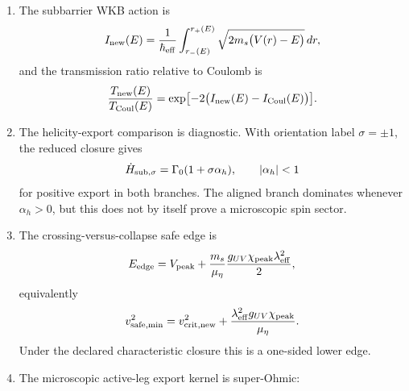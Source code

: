 \begin{theorem}
\begin{enumerate}[leftmargin=2.2em]
  \begin{equation}
  \label{eq:part08-main-vcrit-new}
  v_{\rm crit,new}=\sqrt{\frac{2}{m_s}\bigl(V_{\rm peak}-V(r_0)\bigr)},
  \end{equation}
  while the pure-Coulomb contact threshold is
  \begin{equation}
  \label{eq:part08-main-vcrit-coul}
  v_{\rm contact,Coul}
  =
  \sqrt{\frac{2}{m_s}\left(\frac1{r_{\rm contact}}-\frac1{r_0}\right)}.
  \end{equation}
  If \(v_{\rm crit,new}<v_0<v_{\rm contact,Coul}\), the lowered branch reaches contact while the pure Coulomb branch still turns back.
  \item The subbarrier WKB action is
  \begin{equation}
  \label{eq:part08-main-wkb-action}
  I_{\rm new}(E)=
  \frac{1}{\hbar_{\rm eff}}
  \int_{r_-(E)}^{r_+(E)}
  \sqrt{2m_s\bigl(V(r)-E\bigr)}\,dr,
  \end{equation}
  and the transmission ratio relative to Coulomb is
  \begin{equation}
  \label{eq:part08-main-transmission-ratio}
  \frac{T_{\rm new}(E)}{T_{\rm Coul}(E)}
  =
  \exp\bigl[-2\bigl(I_{\rm new}(E)-I_{\rm Coul}(E)\bigr)\bigr].
  \end{equation}
  \item The helicity-export comparison is diagnostic.  With orientation label \(\sigma=\pm1\), the reduced closure gives
  \begin{equation}
  \label{eq:part08-main-helicity-rate}
  \dot H_{{\rm sub},\sigma}=\Gamma_0(1+\sigma\alpha_h),
  \qquad
  |\alpha_h|<1
  \end{equation}
  for positive export in both branches.  The aligned branch dominates whenever \(\alpha_h>0\), but this does not by itself prove a microscopic spin sector.
  \item The crossing-versus-collapse safe edge is
  \begin{equation}
  \label{eq:part08-main-goldilocks-edge}
  E_{\rm edge}=V_{\rm peak}
  +
  \frac{m_s}{\mu_\eta}
  \frac{g_{UV}\chi_{\rm peak}\lambda_{\rm eff}^{2}}{2},
  \end{equation}
  equivalently
  \begin{equation}
  \label{eq:part08-main-goldilocks-speed}
  v_{\rm safe,min}^{2}
  =
  v_{\rm crit,new}^{2}
  +
  \frac{\lambda_{\rm eff}^{2}g_{UV}\chi_{\rm peak}}{\mu_\eta}.
  \end{equation}
  Under the declared characteristic closure this is a one-sided lower edge.
  \item The microscopic active-leg export kernel is super-Ohmic:

\end{enumerate}
\end{theorem}
